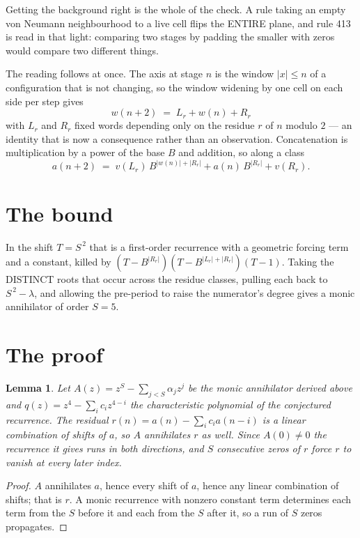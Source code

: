 \documentclass[11pt,a4paper]{article}
\theoremstyle{plain}
\newtheorem{lemma}[theorem]{Lemma}
\theoremstyle{definition}
\begin{document}
Getting the background right is the whole of the check. A rule taking an empty von Neumann
neighbourhood to a live cell flips the ENTIRE plane, and rule 413 is read
in that light: comparing two stages by padding the smaller with zeros would compare two
different things.

The reading follows at once. The axis at stage $n$ is the window $|x|\le n$ of a configuration
that is not changing, so the window widening by one cell on each side per step gives
\[
w(n+2)\;=\;L_r + w(n) + R_r
\]
with $L_r$ and $R_r$ fixed words depending only on the residue $r$ of $n$ modulo $2$ --- an
identity that is now a consequence rather than an observation. Concatenation is multiplication
by a power of the base $B$ and addition, so along a class
\[
a(n+2)\;=\;v(L_r)\,B^{|w(n)|+|R_r|} + a(n)\,B^{|R_r|} + v(R_r).
\]

\section{The bound}

In the shift $T=S^{\,2}$ that is a first-order recurrence with a geometric forcing term and a
constant, killed by $(T-B^{|R_r|})(T-B^{|L_r|+|R_r|})(T-1)$. Taking the DISTINCT roots that
occur across the residue classes, pulling each back to $S^{\,2}-\lambda$, and allowing the
pre-period to raise the numerator's degree gives a monic annihilator of order $S=5$.

\section{The proof}

\begin{lemma}\label{lem:crit}
Let $A(z)=z^S-\sum_{j<S}\alpha_jz^{j}$ be the monic annihilator derived above and
$q(z)=z^{4}-\sum_ic_iz^{4-i}$ the characteristic polynomial of the conjectured
recurrence. The residual $r(n)=a(n)-\sum_ic_ia(n-i)$ is a linear combination of shifts of $a$,
so $A$ annihilates $r$ as well. Since $A(0)\ne0$ the recurrence it gives runs in both
directions, and $S$ consecutive zeros of $r$ force $r$ to vanish at every later index.
\end{lemma}

\begin{proof}
$A$ annihilates $a$, hence every shift of $a$, hence any linear combination of shifts; that is
$r$. A monic recurrence with nonzero constant term determines each term from the $S$ before it
and each from the $S$ after it, so a run of $S$ zeros propagates.
\end{proof}
\end{document}
